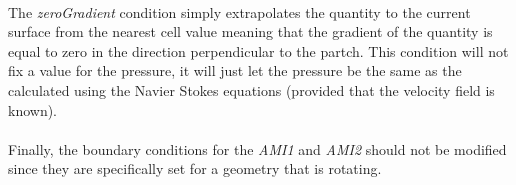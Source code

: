 \paragraph{}The \textit{zeroGradient} condition simply extrapolates the quantity to the current surface from the nearest cell value meaning that the gradient of the quantity is equal to zero in the direction perpendicular to the partch. This condition will not fix a value for the pressure, it will just let the pressure be the same as the calculated using the Navier Stokes equations (provided that the velocity field is known).

\paragraph{}Finally, the boundary conditions for the \textit{AMI1} and \textit{AMI2} should not be modified since they are specifically set for a geometry that is rotating.